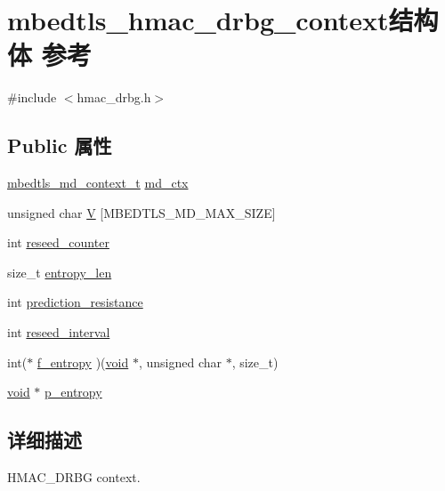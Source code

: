 \hypertarget{structmbedtls__hmac__drbg__context}{}\section{mbedtls\+\_\+hmac\+\_\+drbg\+\_\+context结构体 参考}
\label{structmbedtls__hmac__drbg__context}


{\ttfamily \#include $<$hmac\+\_\+drbg.\+h$>$}

\subsection*{Public 属性}
\begin{DoxyCompactItemize}
\item 
\hyperlink{structmbedtls__md__context__t}{mbedtls\+\_\+md\+\_\+context\+\_\+t} \hyperlink{structmbedtls__hmac__drbg__context_ae5ab42fe02b5f9d26c5b4535e3614a4d}{md\+\_\+ctx}
\item 
unsigned char \hyperlink{structmbedtls__hmac__drbg__context_a3e426c343012174c037a462535d23715}{V} \mbox{[}M\+B\+E\+D\+T\+L\+S\+\_\+\+M\+D\+\_\+\+M\+A\+X\+\_\+\+S\+I\+ZE\mbox{]}
\item 
int \hyperlink{structmbedtls__hmac__drbg__context_a3bdabbbda4d50c954907f5db1f8cecaf}{reseed\+\_\+counter}
\item 
size\+\_\+t \hyperlink{structmbedtls__hmac__drbg__context_a137d68a6581248a2a6fbe06dae4a830b}{entropy\+\_\+len}
\item 
int \hyperlink{structmbedtls__hmac__drbg__context_a2c486e648011f32883056541249f7a80}{prediction\+\_\+resistance}
\item 
int \hyperlink{structmbedtls__hmac__drbg__context_aa69d31aabb0c213dd5f3ea38b8f3f1ad}{reseed\+\_\+interval}
\item 
int($\ast$ \hyperlink{structmbedtls__hmac__drbg__context_aab9615a6dcd72775be46bca4197df058}{f\+\_\+entropy} )(\hyperlink{interfacevoid}{void} $\ast$, unsigned char $\ast$, size\+\_\+t)
\item 
\hyperlink{interfacevoid}{void} $\ast$ \hyperlink{structmbedtls__hmac__drbg__context_a218d146b662c9795b9f05b94fa482790}{p\+\_\+entropy}
\end{DoxyCompactItemize}


\subsection{详细描述}
H\+M\+A\+C\+\_\+\+D\+R\+BG context. 

